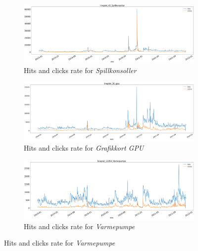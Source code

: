 \begin{figure}[h!]
  \centering
  \caption{Category plots of hits and click rate from 2019-2021}
  \label{fig:lineplot2}

  \begin{subfigure}[b]{\textwidth}
    \includegraphics[width=\textwidth]{./figs/code_generated/data_exploration/lineplot_43_Spillkonsoller.png}
    \hfill
    \caption{Hits and clicks rate for \textit{Spillkonsoller}}
    \label{fig:lineplot-Spillkonsoller}
  \end{subfigure}
  \begin{subfigure}[b]{\textwidth}
    \includegraphics[width=\textwidth]{./figs/code_generated/data_exploration/lineplot_30_gpu.png}
    \hfill
    \caption{Hits and clicks rate for \textit{Grafikkort GPU}}
    \label{fig:lineplot-GPU}
  \end{subfigure}

  \begin{subfigure}[b]{\textwidth}
    \includegraphics[width=\textwidth]{./figs/code_generated/data_exploration/lineplot_11054_Varmepumpe.png}
    \hfill
    \caption{Hits and clicks rate for \textit{Varmepumpe}}
    \label{fig:lineplot-Varmepumpe}
  \end{subfigure}
\end{figure}

